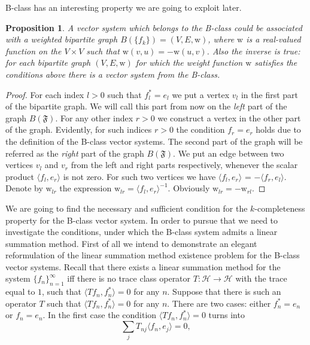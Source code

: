 \documentclass[12pt]{article}
\renewcommand{\cal}[1]{\mathcal{#1}}
\newcommand\inner[2]{\langle #1, #2 \rangle}
\newtheorem{prop}{Proposition}
\theoremstyle{definition}
\newcommand{\seq}[1]{\{{#1}_n\}_{n=1}^\infty}
\newcommand{\fsys}{\mathfrak{F}}
\newcommand{\wt}{\mathrm{w}}
\numberwithin{remark}{section}
\numberwithin{theorem}{section}
\numberwithin{prop}{section}
\numberwithin{equation}{section}
\numberwithin{lemma}{section}
\numberwithin{prop_under_lemma}{lemma}
\begin{document}
    B-class has an interesting property we are going to exploit later.
    \begin{prop}
        A vector system which belongs to the B-class could be associated with a
        weighted bipartite graph $B(\{f_k\}) = (V, E, \wt)$, where $\wt$ is a
        real-valued function on the $V\times V$ such that $\wt(v, u) = -\wt(u, v)$.
        Also the inverse is true: for each bipartite graph $(V, E, \wt)$ for which the weight function
        $\wt$ satisfies the conditions above there is a vector system from the B-class.
    \end{prop}
    \begin{proof}
        For each index $l > 0$ such that $f^*_l = e_l$ we put a vertex $v_l$ in the first part of the bipartite graph.
        We will call this part from now on the \textit{left} part of the graph $B(\fsys)$.
        For any other index $r > 0$ we construct a vertex in the other part of the graph.
        Evidently, for such indices $r > 0$ the condition $f_r = e_r$ holds due to the definition of the B-class vector systems.
        The second part of the graph will be referred as the \textit{right} part of the graph $B(\fsys)$.
        We put an edge between two vertices $v_l$ and $v_r$ from the left and right parts respectively,
        whenever the scalar product $\inner{f_l}{e_r}$ is not zero.
        For such two vertices we have $\inner{f_l}{e_r}$ = $-\inner{f_r}{e_l}$.
        Denote by $\wt_{lr}$ the expression $\wt_{lr} = \inner{f_l}{e_r}^{-1}$.
        Obviously $\wt_{lr} = -\wt_{rl}$.
    \end{proof}
    We are going to find the necessary and sufficient condition for the $k$-completeness property for the B-class vector system.
    In order to pursue that we need to investigate the conditions, under which the B-class system admits a linear summation method.
    First of all we intend to demonstrate an elegant reformulation of the linear summation method existence problem for
      the B-class vector systems.
    Recall that there exists a linear summation method for the system $\seq{f}$
      iff there is no trace class operator $T: \cal{H} \to \cal{H}$ with the trace equal to $1$,
      such that $\inner{Tf_n}{f_n^*} = 0$ for any $n$.
    Suppose that there is such an operator $T$ such that $\inner{Tf_n}{f_n^*} = 0$ for any $n$.
    There are two cases: either $f^*_n = e_n$ or $f_n = e_n$.
    In the first case the condition $\inner{Tf_n}{f_n^*} = 0$ turns into
    \begin{equation}
        \label{left-eqn}
        \sum_j T_{nj} \inner{f_n}{e_j} = 0,
    \end{equation}
\end{document}
